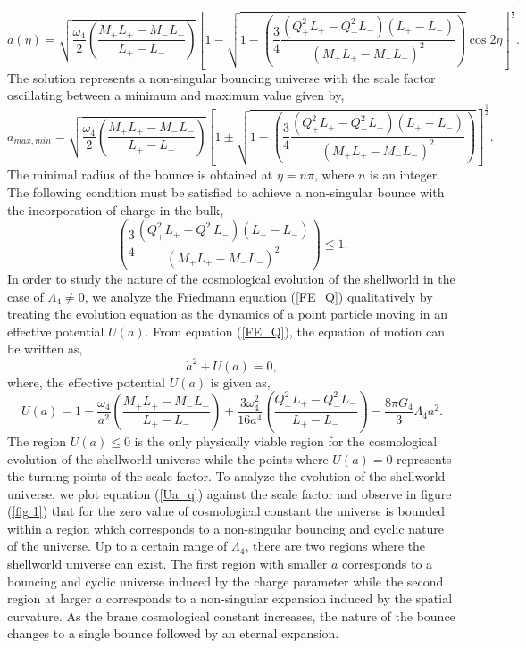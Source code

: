 \documentclass[12pt]{article}
\begin{document}
\begin{equation}\label{scale_factor}
a(\eta)=\sqrt{\frac{\omega_4}{2}\left(\frac{M_+L_+-M_-L_-}{L_+-L_-}\right)}\left[1-\sqrt{1-\left(\frac{3}{4}\frac{(Q_+^2L_+-Q_-^2L_-)(L_+-L_-)}{(M_+L_+-M_-L_- )^2}\right)}\cos2\eta\right]^{\frac{1}{2}}.
\end{equation}
The solution represents a non-singular bouncing universe with the scale factor oscillating between a minimum and maximum value given by,
\begin{equation}
a_{max,min}=\sqrt{\frac{\omega_4}{2}\left(\frac{M_+L_+-M_-L_-}{L_+-L_-}\right)}\left[1\pm\sqrt{1-\left(\frac{3}{4}\frac{(Q_+^2L_+-Q_-^2L_-)(L_+-L_-)}{(M_+L_+-M_-L_- )^2}\right)}\right]^{\frac{1}{2}}.
\end{equation}
The minimal radius of the bounce is obtained at $\eta=n\pi$, where $n$ is an integer. 
The following condition must be satisfied to achieve a non-singular bounce with the incorporation of charge in the bulk,
\begin{equation}\label{con_1}
\left(\frac{3}{4}\frac{(Q_+^2L_+-Q_-^2L_-)(L_+-L_-)}{(M_+L_+-M_-L_- )^2}\right)\leq 1.
\end{equation}
In order to study the nature of the cosmological evolution of the shellworld in the case of $\Lambda_4\neq0$, we analyze the Friedmann equation (\ref{FE_Q}) qualitatively by treating the evolution equation as the dynamics of a point particle moving in an effective potential $U(a)$. From equation (\ref{FE_Q}), the equation of motion can be written as,
\begin{equation}
\dot{a}^2+U(a)=0,
\end{equation}
where, the effective potential $U(a)$ is given as,
\begin{equation}\label{Ua_q}
	U(a)=1-\frac{\omega_4}{a^2}\left(\frac{M_+L_+-M_-L_-}{L_+-L_-}\right)+\frac{3\omega_4^2}{16a^4}\left(\frac{Q_+^2L_+-Q_-^2L_-}{L_+-L_-}\right)-\frac{8\pi G_4 }{3}\Lambda_4 a^2.
\end{equation}
The region $U(a)\leq0$ is the only physically viable region for the cosmological evolution of the shellworld universe while the points where $U(a)=0$ represents the turning points of the scale factor. 
To analyze the evolution of the shellworld universe, we plot equation (\ref{Ua_q}) against the scale factor and observe in figure (\ref{fig 1}) that for the zero value of cosmological constant the universe is bounded within a region which corresponds to a non-singular bouncing and cyclic nature of the universe. Up to a certain range of $\Lambda_4$, there are two regions where the shellworld universe can exist. The first region with smaller $a$ corresponds to a bouncing and cyclic universe induced by the charge parameter while the second region at larger $a$ corresponds to a non-singular expansion induced by the spatial curvature. As the brane cosmological constant increases, the nature of the bounce changes to a single bounce followed by an eternal expansion. \\
\end{document}
